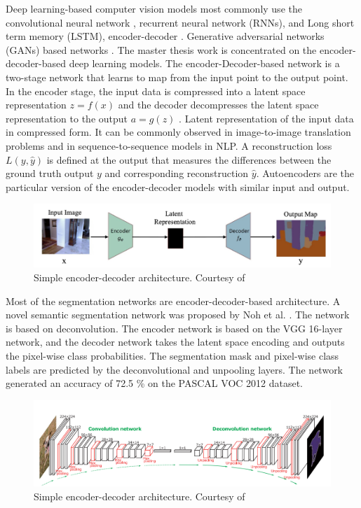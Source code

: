     Deep learning-based computer vision models most commonly use the convolutional neural network \cite{61_chen2017rethinking}, recurrent neural network (RNNs), and Long short term memory (LSTM), encoder-decoder \cite{62_badrinarayanan2017segnet}. Generative adversarial networks (GANs) based networks \cite{60_minaee2021image}. The master thesis work is concentrated on the encoder-decoder-based deep learning models. The encoder-Decoder-based network is a two-stage network that learns to map from the input point to the output point. In the encoder stage, the input data is compressed into a latent space representation $ z = f(x)$ and the decoder decompresses the latent space representation to the output $ a = g(z)$ \cite{63_goodfellow2014generative}. Latent representation of the input data in compressed form. It can be commonly observed in image-to-image translation problems and in sequence-to-sequence models in NLP. A reconstruction loss $ L(y, \hat{y})$ is defined at the output that measures the differences between the ground truth output $y$ and corresponding reconstruction $\hat{y}$. Autoencoders are the particular version of the encoder-decoder models with similar input and output.
    
    \begin{figure}[h]
    	\centering
    	\includegraphics[width=14cm]{images/en_de.png}
    	\caption{Simple encoder-decoder architecture. Courtesy of \cite{60_minaee2021image}}
    	\label{fig:en_de}
    \end{figure} 		
    
	Most of the segmentation networks are encoder-decoder-based architecture. A novel semantic segmentation network was proposed by Noh et al. \cite{64_noh2015learning}. The network is based on deconvolution. The encoder network is based on the VGG 16-layer network, and the decoder network takes the latent space encoding and outputs the pixel-wise class probabilities. The segmentation mask and pixel-wise class labels are predicted by the deconvolutional and unpooling layers. The network generated an accuracy of 72.5 \% on the PASCAL VOC 2012 dataset. 
    
    \begin{figure}[h]
    	\centering
    	\includegraphics[width=14cm]{images/general_seg.png}
    	\caption{Simple encoder-decoder architecture. Courtesy of \cite{64_noh2015learning}}
    	\label{fig:general_seg}
    \end{figure} 
    
